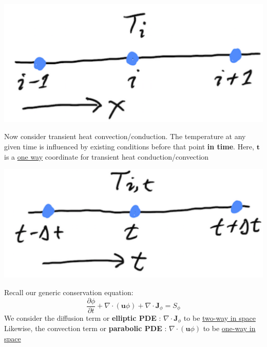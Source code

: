 \documentclass[11pt]{article}
\begin{document}
\begin{center}
\includegraphics[scale=0.2]{../pic/heatTwoway.png}
\end{center}
Now consider transient heat convection/conduction. The temperature at any given time is influenced by
existing conditions before that point \textbf{in time}. Here, \(\textbf{t}\) is a \uline{one way} coordinate for transient heat conduction/convection

\begin{center}
\includegraphics[scale=0.2]{../pic/heatOneway.png}
\end{center}
Recall our generic conservation equation:
\begin{equation*}
\frac{\partial \phi}{\partial t} + \nabla \cdot (\textbf{u}\phi) + \nabla \cdot \textbf{J}_\phi = S_\phi
\end{equation*}
We consider the diffusion term or \textbf{elliptic PDE} :  \(\boxed{\nabla \cdot \textbf{J}_\phi}\) to be \uline{two-way in space}\\
Likewise, the convection term or \textbf{parabolic PDE} :  \(\boxed{\nabla \cdot (\textbf{u}\phi)}\) to be \uline{one-way in space} 
\end{document}

